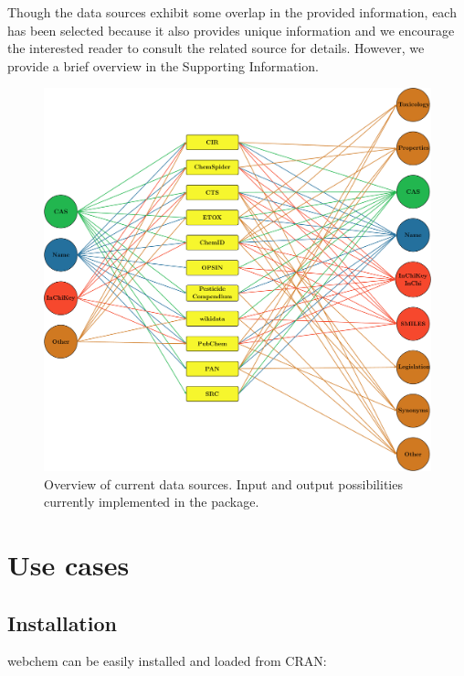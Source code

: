 Though the data sources exhibit some overlap in the provided information, each has been selected because it also provides unique information and we encourage the interested reader to consult the related source for details. 
However, we provide a brief overview in the Supporting Information.

\begin{figure}[H]
  \centering
  \includegraphics[width=\textwidth]{chapters/webchem/fig1.pdf}
  \caption[Overview of current data sources.]{Overview of current data sources. Input and output possibilities currently implemented in the package.}
  \label{fig:fig1}
\end{figure}


\section[Use cases]{Use cases}
\subsection[Install webchem]{Installation}
webchem can be easily installed and loaded from CRAN:

\begin{knitrout}
\color{fgcolor}\begin{kframe}
\begin{alltt}
\hlstd{(}\hlstd{)}
\hlstd{(}\hlstd{)}
\end{alltt}
\end{kframe}
\end{knitrout}




